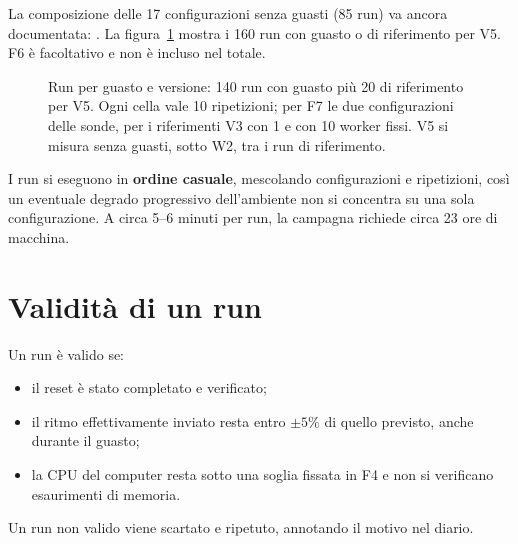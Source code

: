 La composizione delle 17 configurazioni senza guasti (85 run) va ancora documentata: . La figura~\ref{fig:matrice} mostra i 160 run con guasto o di riferimento per V5. F6 è facoltativo e non è incluso nel totale.

\begin{figure}[htbp]
\centering
{}
\caption{Run per guasto e versione: 140 run con guasto più 20 di riferimento per V5. Ogni cella vale 10 ripetizioni; per F7 le due configurazioni delle sonde, per i riferimenti V3 con 1 e con 10 worker fissi. V5 si misura senza guasti, sotto W2, tra i run di riferimento.}
\label{fig:matrice}
\end{figure}

I run si eseguono in \textbf{ordine casuale}, mescolando configurazioni e ripetizioni, così un eventuale degrado progressivo dell'ambiente non si concentra su una sola configurazione. A circa 5--6 minuti per run, la campagna richiede circa 23 ore di macchina.

\section{Validità di un run}

Un run è valido se:
\begin{itemize}
  \item il reset è stato completato e verificato;
  \item il ritmo effettivamente inviato resta entro $\pm 5\%$ di quello previsto, anche durante il guasto;
  \item la CPU del computer resta sotto una soglia fissata in F4 e non si verificano esaurimenti di memoria.
\end{itemize}
Un run non valido viene scartato e ripetuto, annotando il motivo nel diario.

